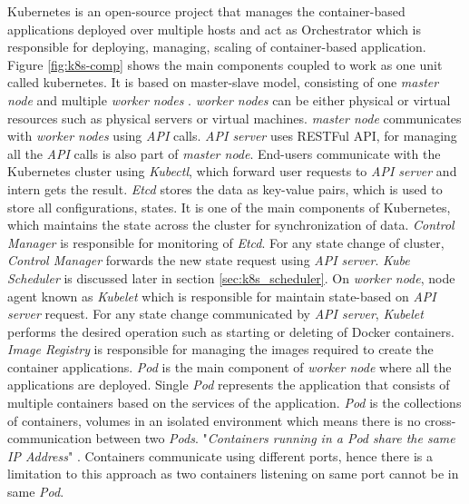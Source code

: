 Kubernetes is an open-source project that manages the container-based applications deployed over multiple hosts and act as Orchestrator which is responsible for deploying, managing, scaling of container-based application\cite{k8s-git}. Figure \ref{fig:k8s-comp} shows the main components coupled to work as one unit called kubernetes. It is based on master-slave model, consisting of one \emph{master node} and multiple \emph{worker nodes} \cite{Santos2019}. \emph{worker nodes} can be either physical or virtual resources such as physical servers or virtual machines. \emph{master node} communicates with \emph{worker nodes} using \emph{API} calls\cite{Santos2019}. \emph{API server} uses RESTFul API, for managing all the \emph{API} calls is also part of \emph{master node}. End-users communicate with the Kubernetes cluster using \emph{Kubectl}, which forward user requests to \emph{API server} and intern gets the result. \emph{Etcd} stores the data as key-value pairs, which is used to store all configurations, states. It is one of the main components of Kubernetes, which maintains the state across the cluster for synchronization of data\cite{Santos2019}. \emph{Control Manager} is responsible for monitoring of \emph{Etcd}. For any state change of cluster, \emph{Control Manager} forwards the new state request using \emph{API server}\cite{Santos2019}. \emph{Kube Scheduler} is discussed later in section \ref{sec:k8s_scheduler}. On \emph{worker node}, node agent known as \emph{Kubelet} which is responsible for maintain state-based on \emph{API server} request\cite{Santos2019}. For any state change communicated by \emph{API server}, \emph{Kubelet} performs the desired operation such as starting or deleting of Docker containers\cite{Santos2019}. \emph{Image Registry} is responsible for managing the images required to create the container applications. \emph{Pod} is the main component of \emph{worker node} where all the applications are deployed. Single \emph{Pod} represents the application that consists of multiple containers based on the services of the application. \emph{Pod} is the collections of containers, volumes in an isolated environment which means there is no cross-communication between two \emph{Pods}\cite{Santos2019}. "\emph{Containers running in a Pod share the same IP Address}" \cite{Santos2019}. Containers communicate using different ports, hence there is a limitation to this approach as two containers listening on same port cannot be in same \emph{Pod}\cite{Santos2019}.

